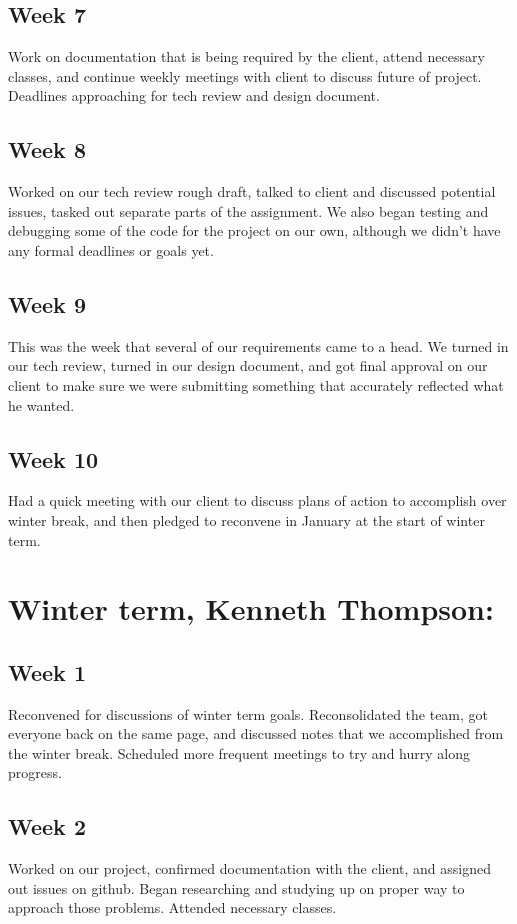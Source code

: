 \documentclass{article}
\begin{document}
\subsection{Week 7} 
Work on documentation that is being required by the client, attend necessary classes, and continue weekly meetings with client to discuss future of project. Deadlines approaching for tech review and design document. 
\subsection{Week 8} 
Worked on our tech review rough draft, talked to client and discussed potential issues, tasked out separate parts of the assignment. We also began testing and debugging some of the code for the project on our own, although we didn’t have any formal deadlines or goals yet.
\subsection{Week 9} 
This was the week that several of our requirements came to a head. We turned in our tech review, turned in our design document, and got final approval on our client to make sure we were submitting something that accurately reflected what he wanted.
\subsection{Week 10} 
Had a quick meeting with our client to discuss plans of action to accomplish over winter break, and then pledged to reconvene in January at the start of winter term. 
\section{Winter term, Kenneth Thompson:}
\subsection{Week 1}
Reconvened for discussions of winter term goals. Reconsolidated the team, got everyone back on the same page, and discussed notes that we accomplished from the winter break. Scheduled more frequent meetings to try and hurry along progress.
\subsection{Week 2}
Worked on our project, confirmed documentation with the client, and assigned out issues on github. Began researching and studying up on proper way to approach those problems. Attended necessary classes. 
\end{document}

